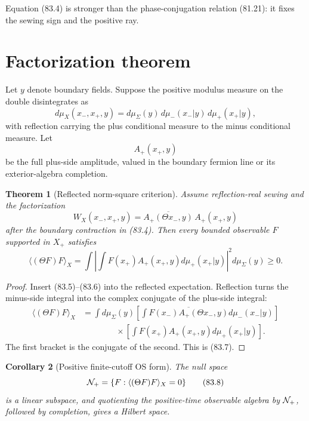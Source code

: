 \documentclass[11pt]{article}
\newtheorem{theorem}{Theorem}[section]
\newtheorem{corollary}[theorem]{Corollary}
\theoremstyle{remark}
\begin{document}
Equation (83.4) is stronger than the phase-conjugation relation
(81.21): it fixes the sewing sign and the positive ray.

\section{Factorization theorem}

Let \(y\) denote boundary fields.  Suppose the positive modulus
measure on the double disintegrates as
\[
 d\mu_X(x_-,x_+,y)
 =
 d\mu_\Sigma(y)\,
 d\mu_-(x_-|y)\,
 d\mu_+(x_+|y),                                      \tag{83.5}
\]
with reflection carrying the plus conditional measure to the
minus conditional measure.  Let
\[
 A_+(x_+,y)
\]
be the full plus-side amplitude, valued in the boundary fermion
line or its exterior-algebra completion.

\begin{theorem}[Reflected norm-square criterion]
\label{thm:v15v83-norm-square}
Assume reflection-real sewing and the factorization
\[
 W_X(x_-,x_+,y)
 =
 \overline{A_+(\Theta x_-,y)}\,A_+(x_+,y)             \tag{83.6}
\]
after the boundary contraction in (83.4).  Then every bounded
observable \(F\) supported in \(X_+\) satisfies
\[
 \boxed{
 \langle(\Theta F)F\rangle_X
 =
 \int
 \left|
 \int F(x_+)A_+(x_+,y)d\mu_+(x_+|y)
 \right|^2d\mu_\Sigma(y)
 \geq0.}                                              \tag{83.7}
\]
\end{theorem}

\begin{proof}
Insert (83.5)--(83.6) into the reflected expectation.  Reflection
turns the minus-side integral into the complex conjugate of the
plus-side integral:
\[
\begin{split}
 \langle(\Theta F)F\rangle_X
 &=
 \int d\mu_\Sigma(y)
 \left[
 \int\overline{F(x_-)A_+(\Theta x_-,y)}
 d\mu_-(x_-|y)
 \right]\\
 &\qquad\qquad\times
 \left[
 \int F(x_+)A_+(x_+,y)d\mu_+(x_+|y)
 \right].
\end{split}
\]
The first bracket is the conjugate of the second.  This is (83.7).
\end{proof}

\begin{corollary}[Positive finite-cutoff OS form]
\label{cor:v15v83-os}
The null space
\[
 {\cal N}_+=
 \{F:\langle(\Theta F)F\rangle_X=0\}                  \tag{83.8}
\]
is a linear subspace, and quotienting the positive-time observable
algebra by \({\cal N}_+\), followed by completion, gives a Hilbert
space.
\end{corollary}
\end{document}
